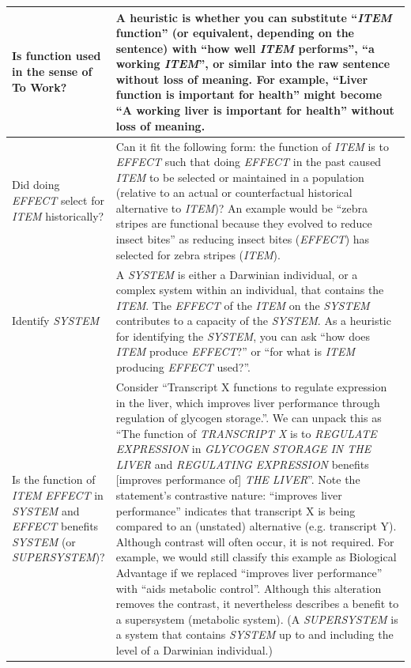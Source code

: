 \documentclass{article}
\begin{document}
\begin{landscape}
\begin{table}
\begin{tabular}{|p{0.17\linewidth}|p{0.97\linewidth}|}
    \hline
    Is function used in the sense of To Work? & A heuristic is whether you can substitute ``\emph{ITEM} function'' (or equivalent, depending on the sentence) with ``how well \emph{ITEM} performs'', ``a working \emph{ITEM}'', or similar into the raw sentence without loss of meaning. For example, ``Liver function is important for health'' might become ``A working liver is important for health'' without loss of meaning.\\
    \hline
    Did doing \emph{EFFECT} select for \emph{ITEM} historically? & Can it fit the following form: the function of \emph{ITEM} is to \emph{EFFECT} such that doing \emph{EFFECT} in the past caused \emph{ITEM} to be selected or maintained in a population (relative to an actual or counterfactual historical alternative to \emph{ITEM})? An example would be ``zebra stripes are functional because they evolved to reduce insect bites'' as reducing insect bites (\emph{EFFECT}) has selected for zebra stripes (\emph{ITEM}).\\
    \hline
    Identify \emph{SYSTEM} & A \emph{SYSTEM} is either a Darwinian individual, or a complex system within an individual, that contains the \emph{ITEM}. The \emph{EFFECT} of the \emph{ITEM} on the \emph{SYSTEM} contributes to a capacity of the \emph{SYSTEM}. As a heuristic for identifying the \emph{SYSTEM}, you can ask  ``how does \emph{ITEM} produce \emph{EFFECT}?'' or ``for what is \emph{ITEM} producing \emph{EFFECT} used?''. \\
    \hline
    Is the function of \emph{ITEM} \emph{EFFECT} in \emph{SYSTEM} and \emph{EFFECT} benefits \emph{SYSTEM} (or \emph{SUPERSYSTEM})? & Consider ``Transcript X functions to regulate expression in the liver, which improves liver performance through regulation of glycogen storage.''. We can unpack this as ``The function of \emph{TRANSCRIPT X} is to \emph{REGULATE EXPRESSION} in \emph{GLYCOGEN STORAGE IN THE LIVER} and \emph{REGULATING EXPRESSION} benefits [improves performance of] \emph{THE LIVER}''. Note the statement's contrastive nature: ``improves liver performance'' indicates that transcript X is being compared to an (unstated) alternative (e.g. transcript Y). Although contrast will often occur, it is not required. For example, we would still classify this example as Biological Advantage if we replaced ``improves liver performance'' with ``aids metabolic control''. Although this alteration removes the contrast, it nevertheless describes a benefit to a supersystem (metabolic system). (A \emph{SUPERSYSTEM} is a system that contains \emph{SYSTEM} up to and including the level of a Darwinian individual.) \\

\end{tabular}
\end{table}
\end{landscape}
\end{document}
